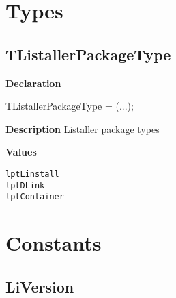 \documentclass{report}
\newif\ifpdf
\begin{document}
\section{Types}
\ifpdf
\subsection*{\large{\textbf{TListallerPackageType}}\normalsize\hspace{1ex}\hrulefill}
\else
\subsection*{TListallerPackageType}
\fi
\label{licommon-TListallerPackageType}
\begin{list}{}{
\setlength{\itemindent}{0cm}
\setlength{\listparindent}{0cm}
\setlength{\leftmargin}{\evensidemargin}
\addtolength{\leftmargin}{\tmplength}
\settowidth{\labelsep}{X}
\addtolength{\leftmargin}{\labelsep}
\setlength{\labelwidth}{\tmplength}
}
\item[\textbf{Declaration}\hfill]
\ifpdf
\begin{flushleft}
\fi
\begin{ttfamily}
TListallerPackageType = (...);\end{ttfamily}

\ifpdf
\end{flushleft}
\fi

\par
\item[\textbf{Description}]
Listaller package types\item[\textbf{Values}]
\begin{description}
\item[\texttt{lptLinstall}]  
\item[\texttt{lptDLink}]  
\item[\texttt{lptContainer}]  
\end{description}


\end{list}
\section{Constants}
\ifpdf
\subsection*{\large{\textbf{LiVersion}}\normalsize\hspace{1ex}\hrulefill}
\else
\end{document}
